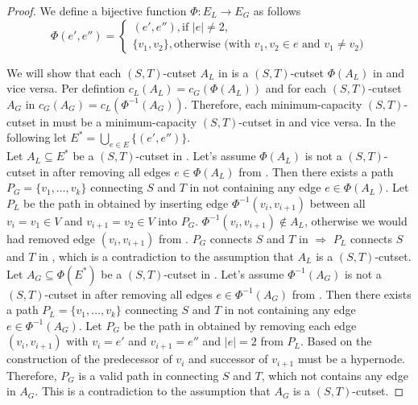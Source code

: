 \begin{proof}

We define a bijective function $\Phi: E_L \rightarrow E_G$ as follows
\[ \Phi(e',e'') = 
   \begin{cases}
      (e',e''), \text{if } |e| \neq 2, \\
      \{v_1,v_2\}, \text{otherwise (with $v_1,v_2 \in e$ and $v_1 \neq v_2$)}
   \end{cases} \]

We will show that each $(S,T)$-cutset $A_L$ in  is a $(S,T)$-cutset $\Phi(A_L)$ in
 and vice versa. Per defintion $c_L(A_L) = c_G(\Phi(A_L))$ and for each $(S,T)$-cutset
$A_G$ in  $c_G(A_G) = c_L(\Phi^{-1}(A_G))$. Therefore, each minimum-capacity $(S,T)$-cutset
in  must be a minimum-capacity $(S,T)$-cutset in  and vice versa. In the following 
let $E^* = \bigcup_{e \in E} \{(e',e'')\}$. \\
Let $A_L \subseteq E^*$ be a $(S,T)$-cutset in . Let's assume $\Phi(A_L)$ is not a $(S,T)$-cutset
in  after removing all edges $e \in \Phi(A_L)$ from . Then there exists a path
$P_G = \{v_1,\ldots,v_k\}$ connecting $S$ and $T$ in  not containing any edge $e \in \Phi(A_L)$.
Let $P_L$ be the path in  obtained by inserting edge $\Phi^{-1}(v_i,v_{i+1})$ between all
$v_i = v_1 \in V$ and $v_{i+1} = v_2 \in V$ into $P_G$. $\Phi^{-1}(v_i,v_{i+1}) \notin A_L$, otherwise
we would had removed edge $(v_i,v_{i+1})$ from . $P_G$ connects $S$ and $T$ in  
$\Rightarrow$ $P_L$ connects $S$ and $T$ in , which is a contradiction to the assumption
that $A_L$ is a $(S,T)$-cutset. \\
Let $A_G \subseteq \Phi(E^*)$ be a $(S,T)$-cutset in . Let's assume $\Phi^{-1}(A_G)$ is not
a $(S,T)$-cutset in  after removing all edges $e \in \Phi^{-1}(A_G)$ from . Then
there exists a path $P_L = \{v_1,\ldots,v_k\}$ connecting $S$ and $T$ in  not containing any
edge $e \in \Phi^{-1}(A_G)$. Let $P_G$ be the path in  obtained by removing each edge
$(v_i,v_{i+1})$ with $v_i = e'$ and $v_{i+1} = e''$ and $|e| = 2$ from $P_L$. Based on the construction
of  the predecessor of $v_i$ and successor of $v_{i+1}$ must be a hypernode.
Therefore, $P_G$ is a valid path in  connecting $S$ and $T$, which not contains any edge in 
$A_G$. This is a contradiction to the assumption that $A_G$ is a $(S,T)$-cutset.


\end{proof}
